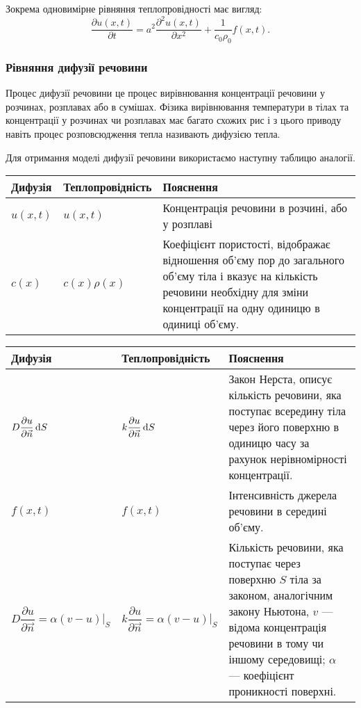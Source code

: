 \begin{remark}
	Зокрема одновимірне рівняння теплопровідності має вигляд:
	\begin{equation}
		\frac{\partial u(x, t)}{\partial t} = a^2 \frac{\partial^2 u(x, t)}{\partial x^2} + \frac{1}{c_0 \rho_0} f(x, t).
	\end{equation}
\end{remark}

\subsubsection{Рівняння дифузії речовини}

Процес дифузії речовини це процес вирівнювання концентрації речовини у розчинах, розплавах або в сумішах. Фізика вирівнювання температури в тілах та концентрації у розчинах чи розплавах має багато схожих рис і з цього приводу навіть процес розповсюдження тепла називають дифузією тепла. \medskip

Для отримання моделі дифузії речовини використаємо наступну таблицю аналогії.
\begin{table}[H]
	\centering
	\begin{tabular}{| C{3.75cm} | C{3.75cm} | L{4.5cm} |}
		\hline
		Дифузія & Теплопровідність & Пояснення \\ \hline
		$u(x, t)$ & $u(x, t)$ & Концентрація речовини в розчині, або у розплаві \\ \hline
		$c(x)$ & $c(x) \rho(x)$ & Коефіцієнт пористості, відображає відношення об'єму пор до загального об'єму тіла і вказує на кількість речовини необхідну для зміни концентрації на одну одиницю в одиниці об'єму. \\ \hline
	\end{tabular}
\end{table}

\begin{table}[H]
	\centering
	\begin{tabular}{| C{3.75cm} | C{3.75cm} | L{4.5cm} |}
		\hline
		Дифузія & Теплопровідність & Пояснення \\ \hline
		$D \dfrac{\partial u}{\partial \vec n} \mathop{}\!\mathrm{d} S$ & $k \dfrac{\partial u}{\partial \vec n} \mathop{}\!\mathrm{d} S$ & Закон Нерста, описує кількість речовини, яка поступає всередину тіла через його поверхню в одиницю часу за рахунок нерівномірності концентрації. \\ \hline
		$f(x, t)$ & $f(x, t)$ & Інтенсивність джерела речовини в середині об'єму. \\ \hline
 		$D \dfrac{\partial u}{\partial \vec n} = \alpha \left. (v - u)\right|_S$ & $k \dfrac{\partial u}{\partial \vec n} = \alpha \left. (v - u)\right|_S$ & Кількість речовини, яка поступає через поверхню $S$ тіла за законом, аналогічним закону Ньютона,
 		$v$ --- відома концентрація речовини в тому чи іншому середовищі; $\alpha$ --- коефіцієнт проникності поверхні. \\ \hline
 	\end{tabular}
\end{table}

